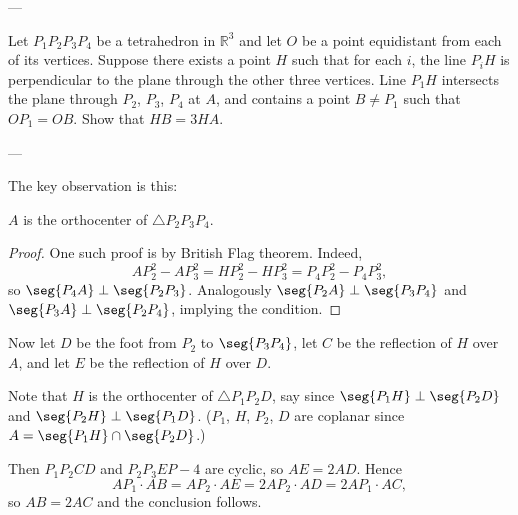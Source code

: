 
---

Let $P_1P_2P_3P_4$ be a tetrahedron in $\mathbb R^3$ and let $O$ be a point equidistant from each of its vertices. Suppose there exists a point $H$ such that for each $i$, the line $P_iH$ is perpendicular to the plane through the other three vertices. Line $P_1H$ intersects the plane through $P_2$, $P_3$, $P_4$ at $A$, and contains a point $B\ne P_1$ such that $OP_1=OB$. Show that $HB=3HA$.

---

The key observation is this:
\begin{iclaim*}
    $A$ is the orthocenter of $\triangle P_2P_3P_4$.
\end{iclaim*}
\begin{proof}
    One such proof is by British Flag theorem. Indeed, \[AP_2^2-AP_3^2=HP_2^2-HP_3^2=P_4P_2^2-P_4P_3^2,\]
    so $\seg{P_4A}\perp\seg{P_2P_3}$. Analogously $\seg{P_2A}\perp\seg{P_3P_4}$ and $\seg{P_3A}\perp\seg{P_2P_4}$, implying the condition.
\end{proof}

Now let $D$ be the foot from $P_2$ to $\seg{P_3P_4}$, let $C$ be the reflection of $H$ over $A$, and let $E$ be the reflection of $H$ over $D$.

Note that $H$ is the orthocenter of $\triangle P_1P_2D$, say since $\seg{P_1H}\perp\seg{P_2D}$ and $\seg{P_2H}\perp\seg{P_1D}$. ($P_1$, $H$, $P_2$, $D$ are coplanar since $A=\seg{P_1H}\cap\seg{P_2D}$.)

Then $P_1P_2CD$ and $P_2P_3EP-4$ are cyclic, so $AE=2AD$. Hence \[AP_1\cdot AB=AP_2\cdot AE=2AP_2\cdot AD=2AP_1\cdot AC,\]
so $AB=2AC$ and the conclusion follows.

